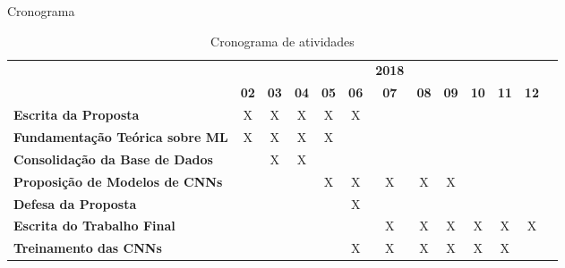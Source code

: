 \begin{frame}{Cronograma}
   \ \  \\[0.1cm]
   \begin{minipage}[b]{\linewidth}
   \begin{table}
   \caption{Cronograma de atividades}
   \label{tab:cronograma}

   \begin{center}
   \begin{small}
   \begin{tabular}{p{5cm}cccccccccccc}
     \toprule
     & &  &  & &  & \textbf{2018}  & &  &  &  &  & \\
                                           & \textbf{02} & \textbf{03} & \textbf{04} & \textbf{05} & \textbf{06} & \textbf{07} & \textbf{08} & \textbf{09} & \textbf{10} & \textbf{11} & \textbf{12} \\
     \midrule
     \textbf{Escrita da Proposta}          &      X      &      X      &      X      &      X      &      X      &             &             &             &             &             &             \\
     \textbf{Fundamentação Teórica sobre
     ML}                     &      X      &      X      &      X      &      X      &             &             &             &             &             &             &             \\
     \textbf{Consolidação da Base de Dados}&             &      X      &      X      &             &             &             &             &             &             &             &             \\
     \textbf{Proposição de Modelos de
    CNNs}         &             &             &             &      X      &      X      &      X      &      X      &      X      &             &             &             \\
     \textbf{Defesa da Proposta}          &             &             &             &             &      X      &             &             &             &             &             &             \\
     \textbf{Escrita do Trabalho Final}    &             &             &             &             &             &      X      &      X      &      X      &      X      &      X      &      X      \\
     \textbf{Treinamento das
     CNNs}         &             &             &             &             &      X      &      X      &      X      &      X      &      X      &      X       &            \\

\end{tabular}
\end{small}
\end{center}
\end{table}
\end{minipage}
\end{frame}
